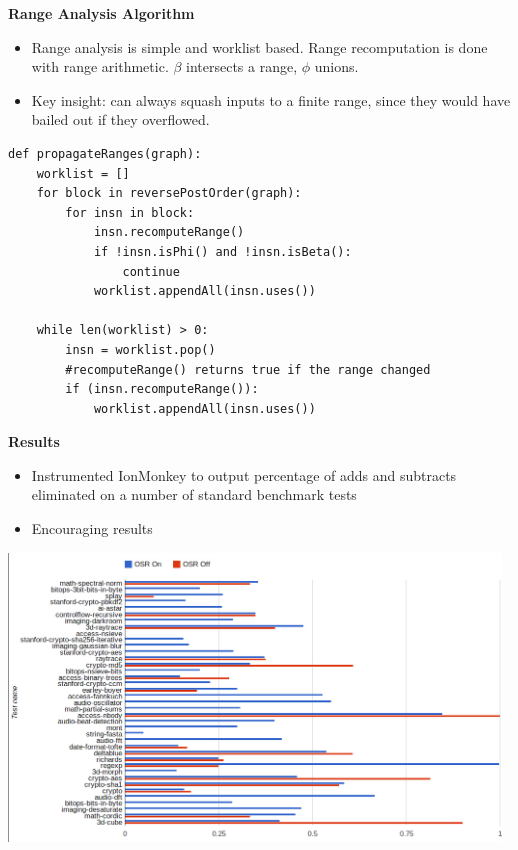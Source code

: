 \documentclass{slides}
\begin{document}
\begin{slide}
\begin{center}
{\Huge \bf{Range Analysis Algorithm}}
\end{center}
\begin{itemize}
\item Range analysis is simple and worklist based. Range recomputation is done with range arithmetic. $\beta$ intersects a range, $\phi$ unions.
\item Key insight: can always squash inputs to a finite range, since they would have bailed out if they overflowed.
\end{itemize}
{\tiny
\begin{verbatim}
def propagateRanges(graph):
    worklist = []
    for block in reversePostOrder(graph):
        for insn in block:
            insn.recomputeRange()
            if !insn.isPhi() and !insn.isBeta():
                continue
            worklist.appendAll(insn.uses())

    while len(worklist) > 0:
        insn = worklist.pop()
        #recomputeRange() returns true if the range changed
        if (insn.recomputeRange()):
            worklist.appendAll(insn.uses())
\end{verbatim}
}
\end{slide}

\begin{slide}
\begin{center}
{\Huge \bf{Results}}
\end{center}
\begin{itemize}
\item Instrumented IonMonkey to output percentage of adds and
  subtracts eliminated on a number of standard benchmark tests
\item Encouraging results
\end{itemize}
\centering
\includegraphics[width=0.98\textwidth]{counts_graph.png}
\end{slide}
\end{document}
